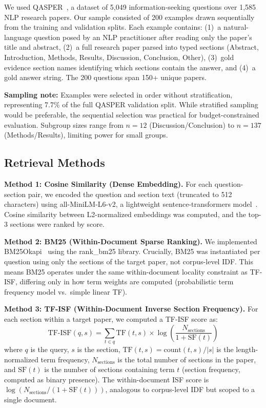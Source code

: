 \documentclass[11pt,letterpaper]{article}
\begin{document}
We used QASPER~\citep{Dasigi2021}, a dataset of 5,049 information-seeking
questions over 1,585 NLP research papers. Our sample consisted of 200 examples
drawn sequentially from the training and validation splits. Each example contains:
(1)~a natural-language question posed by an NLP practitioner after reading only
the paper's title and abstract, (2)~a full research paper parsed into typed
sections (Abstract, Introduction, Methods, Results, Discussion, Conclusion,
Other), (3)~gold evidence section names identifying which sections contain the
answer, and (4)~a gold answer string. The 200 questions span 150+ unique papers.

\textbf{Sampling note:} Examples were selected in order without stratification,
representing 7.7\% of the full QASPER validation split. While stratified sampling
would be preferable, the sequential selection was practical for budget-constrained
evaluation. Subgroup sizes range from $n{=}12$ (Discussion/Conclusion) to
$n{=}137$ (Methods/Results), limiting power for small groups.

\subsection{Retrieval Methods}

\textbf{Method 1: Cosine Similarity (Dense Embedding).}
For each question-section pair, we encoded the question and section text
(truncated to 512 characters) using all-MiniLM-L6-v2, a lightweight
sentence-transformers model~\citep{Reimers2019}. Cosine similarity between
L2-normalized embeddings was computed, and the top-3 sections were ranked by
score.

\textbf{Method 2: BM25 (Within-Document Sparse Ranking).}
We implemented BM25Okapi~\citep{Robertson2009} using the rank\_bm25 library.
Crucially, BM25 was instantiated per question using only the sections of the
target paper, not corpus-level IDF. This means BM25 operates under the same
within-document locality constraint as TF-ISF, differing only in how term weights
are computed (probabilistic term frequency model vs.\ simple linear TF).

\textbf{Method 3: TF-ISF (Within-Document Inverse Section Frequency).}
For each section within a target paper, we computed a TF-ISF score as:
\begin{equation}
  \text{TF-ISF}(q, s) = \sum_{t \in q} \text{TF}(t, s) \times
  \log\!\left(\frac{N_{\text{sections}}}{1 + \text{SF}(t)}\right)
\end{equation}
where $q$ is the query, $s$ is the section, $\text{TF}(t, s) =
\text{count}(t,s)/|s|$ is the length-normalized term frequency, $N_{\text{sections}}$ is the total number of sections in the paper, and
$\text{SF}(t)$ is the number of sections containing term $t$ (section frequency,
computed as binary presence). The within-document ISF score is $\log(N_{\text{sections}} /
(1 + \text{SF}(t)))$, analogous to corpus-level IDF but scoped to a single
document.
\end{document}
